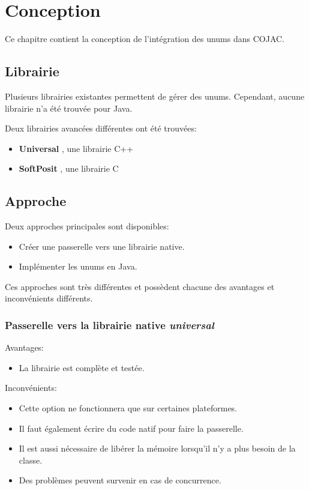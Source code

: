 \section{Conception}

Ce chapitre contient la conception de l'intégration des unums dans COJAC.

\subsection{Librairie}

Plusieurs librairies existantes permettent de gérer des unums. Cependant, aucune librairie n'a été trouvée pour Java.

Deux librairies avancées différentes ont été trouvées:
\begin{itemize}
    \item \textbf{Universal} \cite{universal-github}, une librairie C++
    \item \textbf{SoftPosit} \cite{softposit-github}, une librairie C
\end{itemize}

\subsection{Approche}

Deux approches principales sont disponibles:
\begin{itemize}
    \item Créer une passerelle vers une librairie native.
    \item Implémenter les unums en Java.
\end{itemize}

Ces approches sont très différentes et possèdent chacune des avantages et inconvénients différents.

\subsubsection{Passerelle vers la librairie native \textit{universal}}

Avantages:
\begin{itemize}
    \item La librairie est complète et testée.
\end{itemize}

Inconvénients:
\begin{itemize}
    \item Cette option ne fonctionnera que sur certaines plateformes.
    \item Il faut également écrire du code natif pour faire la passerelle.
    \item Il est aussi nécessaire de libérer la mémoire lorsqu'il n'y a plus besoin de la classe.
    \item Des problèmes peuvent survenir en cas de concurrence.
\end{itemize}

